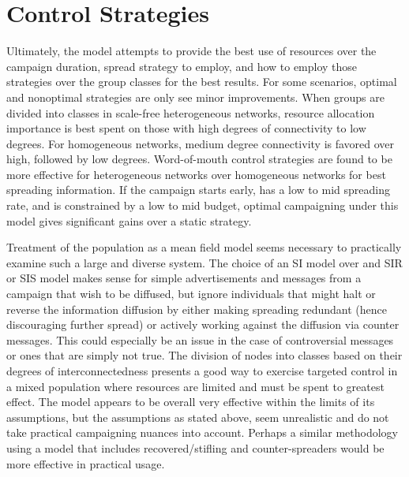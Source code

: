 \section{Control Strategies}

Ultimately, the model attempts to provide the best use of resources over the campaign duration, spread strategy to employ, and how to employ those strategies over the group classes for the best results. For some scenarios, optimal and nonoptimal strategies are only see minor improvements. When groups are divided into classes in scale-free heterogeneous networks, resource allocation importance is best spent on those with high degrees of connectivity to low degrees. For homogeneous networks, medium degree connectivity is favored over high, followed by low degrees. Word-of-mouth control strategies are found to be more effective for heterogeneous networks over homogeneous networks for best spreading information. If the campaign starts early, has a low to mid spreading rate, and is constrained by a low to mid budget, optimal campaigning under this model gives significant gains over a static strategy. \cite{kandhway2016campaigning}

Treatment of the population as a mean field model seems necessary to practically examine such a large and diverse system. The choice of an SI model over and SIR or SIS model makes sense for simple advertisements and messages from a campaign that wish to be diffused, but ignore individuals that might halt or reverse the information diffusion by either making spreading redundant (hence discouraging further spread) or actively working against the diffusion via counter messages. This could especially be an issue in the case of controversial messages or ones that are simply not true. The division of nodes into classes based on their degrees of interconnectedness presents a good way to exercise targeted control in a mixed population where resources are limited and must be spent to greatest effect. The model appears to be overall very effective within the limits of its assumptions, but the assumptions as stated above, seem unrealistic and do not take practical campaigning nuances into account. Perhaps a similar methodology using a model that includes recovered/stifling and counter-spreaders would be more effective in practical usage.

